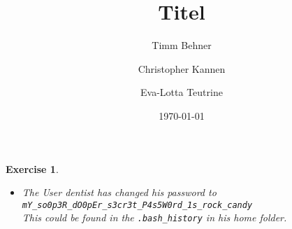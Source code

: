 \documentclass{scrartcl}
\title{Titel}
\author{Timm Behner \and Christopher Kannen \and Eva-Lotta Teutrine}
\date{\today}
\newtheorem{exercise}{Exercise}
\begin{document}
\begin{exercise}\hfill
    \begin{itemize}
        \item The User dentist has changed his password to \\
            \texttt{mY\_so0p3R\_dO0pEr\_s3cr3t\_P4s5W0rd\_1s\_rock\_candy}\\
            This could be found in the \texttt{.bash\_history} in his home
            folder.
    \end{itemize}
\end{exercise}
\end{document}
